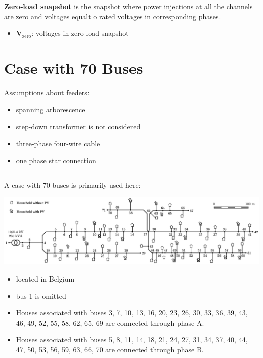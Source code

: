\documentclass[
]{book}
\providecommand{\tightlist}{%
  \setlength{\itemsep}{0pt}\setlength{\parskip}{0pt}}
\begin{document}
\textbf{Zero‐load snapshot} is the snapshot where power injections at all the
channels are zero and voltages equalt o rated voltages in corresponding phases.

\begin{itemize}
\tightlist
\item
  \(\boldsymbol{\bar{V}}_\text{zero}\): voltages in zero‐load snapshot
\end{itemize}

\hypertarget{case}{%
\section{Case with 70 Buses}\label{case}}

Assumptions about feeders:

\begin{itemize}
\tightlist
\item
  spanning arborescence
\item
  step-down transformer is not considered
\item
  three-phase four-wire cable
\item
  one phase star connection
\end{itemize}

\begin{center}\rule{0.5\linewidth}{0.5pt}\end{center}

A case with 70 buses is primarily used here:

\includegraphics{Pictures/case70true.png}

\begin{itemize}
\tightlist
\item
  located in Belgium
\item
  bus 1 is omitted
\item
  Houses associated with buses 3, 7, 10, 13, 16, 20, 23, 26, 30, 33, 36, 39,
  43, 46, 49, 52, 55, 58, 62, 65, 69 are connected through phase A.
\item
  Houses associated with buses 5, 8, 11, 14, 18, 21, 24, 27, 31, 34, 37, 40,
  44, 47, 50, 53, 56, 59, 63, 66, 70 are connected through phase B.
\end{itemize}
\end{document}
